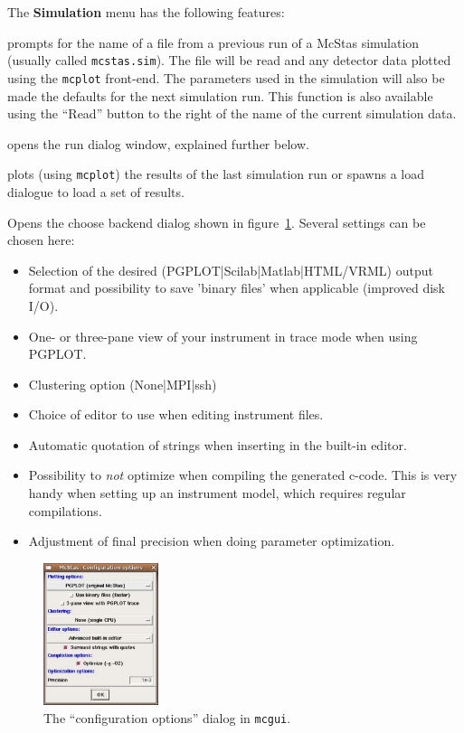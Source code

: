 \noindent The {\bf Simulation} menu has the following features:
\begin{description} 
\item[Simulation/Read old simulation] prompts for the name of a file
  from a previous run of a McStas simulation (usually called
  \verb+mcstas.sim+). The file will be read and any detector data
  plotted using the \verb+mcplot+ front-end. The parameters used in the
  simulation will also be made the defaults for the next simulation
  run. This function is also available using the ``Read'' button to the
  right of the name of the current simulation data.
\item[Simulation/Run simulation] opens the run dialog window, explained
  further below.
\item[Simulation/Plot results] plots (using \verb+mcplot+) the results of the
  last simulation run or spawns a load dialogue to load a set of results.
\item[Simulation/Configuration options] Opens the choose backend dialog shown in
  figure~\ref{fig:mcgui-choose}. Several settings can be chosen here:
\begin{itemize}
  \item Selection of  the desired (PGPLOT|Scilab|Matlab|HTML/VRML) output
    format and possibility to save 'binary files' when
  applicable (improved disk I/O).
  \item One- or three-pane view of your instrument in trace mode when
    using PGPLOT.
  \item Clustering option (None|MPI|ssh)
  \item Choice of editor to use when editing instrument files.
  \item Automatic quotation of strings when inserting in the built-in
    editor.
  \item Possibility to \emph{not} optimize when compiling the
    generated c-code. This is very handy when setting up an instrument model, which requires regular compilations.
  \item Adjustment of final precision when doing parameter optimization.
\end{itemize}
\end{description}

\begin{figure}[htb!]
  \begin{center}
    \includegraphics[width=0.3\textwidth]{figures/choose_backend.eps}
  \end{center}
\caption{The ``configuration options'' dialog in \texttt{mcgui}.}
\label{fig:mcgui-choose}
\end{figure}


